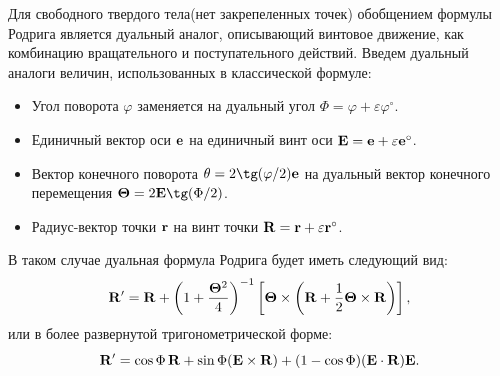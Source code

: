 Для свободного твердого тела(нет закрепеленных точек) обобщением формулы Родрига является дуальный аналог, описывающий винтовое движение, как комбинацию вращательного и поступательного действий.
Введем дуальный аналоги величин, использованных в классической формуле:
\begin{itemize}
    \item Угол поворота $\varphi$ заменяется на дуальный угол $\Phi = \varphi + \varepsilon \varphi^\circ$.
    \item Единичный вектор оси $\vb{e}$ на единичный винт оси $\vb{E} = \vb{e} + \varepsilon \vb{e}^\circ$.
    \item Вектор конечного поворота $\vb{\theta} = 2\tg(\varphi/2)\vb{e}$ на дуальный вектор конечного перемещения $\vb{\Theta} = 2\vb{E} \tg(\Phi/2)$.
    \item Радиус-вектор точки $\vb{r}$ на винт точки $\vb{R} = \vb{r} + \varepsilon \vb{r}^\circ$.
\end{itemize}
В таком случае дуальная формула Родрига будет иметь следующий вид:
\begin{equation*}
    \vb{R}' = \vb{R} + \left(1 + \frac{\vb{\Theta}^2}{4}\right)^{-1} \left[ \vb{\Theta} \times \left( \vb{R} + \frac{1}{2} \vb{\Theta} \times \vb{R} \right) \right],
\end{equation*}
или в более развернутой тригонометрической форме:
\begin{equation*}
    \vb{R}' = \cos \Phi \, \vb{R} + \sin \Phi (\vb{E} \times \vb{R}) + (1 - \cos \Phi)(\vb{E} \cdot \vb{R})\vb{E}.
\end{equation*}

